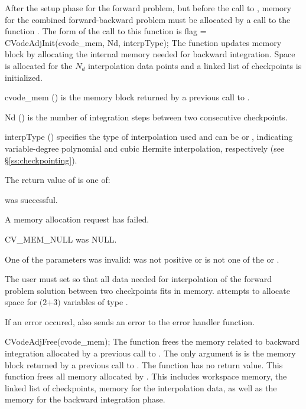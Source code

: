 After the setup phase for the forward problem, but before the call
to , memory for the combined forward-backward problem must be
allocated by a call to the function .
The form of the call to this function is
{
  flag = CVodeAdjInit(cvode\_mem, Nd, interpType);
}
{
  The function  updates {\cvodes} memory block by allocating 
  the internal memory needed for backward integration.
  Space is allocated for the $N_d$ interpolation data points and a linked 
  list of checkpoints is initialized.
}
{
  \begin{args}[interpType]
  \item[cvode\_mem] () 
    is the {\cvodes} memory block returned by a previous call to .
  \item[Nd] () 
    is the number of integration steps between two consecutive checkpoints.
  \item[interpType] ()
    specifies the type of interpolation used and can be 
    or , indicating variable-degree polynomial and cubic Hermite
    interpolation, respectively (see \S\ref{ss:checkpointing}).
  \end{args}
}
{
   The return value  of  is one of:
   \begin{args}
   \item[\Id{CV\_SUCCESS}] 
      was successful.
   \item[\Id{CV\_MEM\_FAIL}]
     A memory allocation request has failed.
   \item[CV\_MEM\_NULL] 
      was NULL.
   \item[\Id{CV\_ILL\_INPUT}]
     One of the parameters was invalid:  was not positive or 
     is not one of the  or .
   \end{args}
}
{
  The user must set  so that all data needed for interpolation of the 
  forward problem solution between two checkpoints fits in memory. 
  attempts to allocate space for $(2$$+3)$ variables of type .

  If an error occured,  also sends an error to the
  error handler function.
}
{
  CVodeAdjFree(cvode\_mem);
}
{
  The function  frees the memory related to backward integration
  allocated by a previous call to .
}
{
  The only argument is  is the {\cvodes} memory block returned by a previous call 
  to .
}
{
  The function  has no return value.
}
{
  This function frees all memory allocated by . This includes workspace memory, 
  the linked list of checkpoints, memory for the interpolation data, as well as the {\cvodes} memory 
  for the backward integration phase.
}

